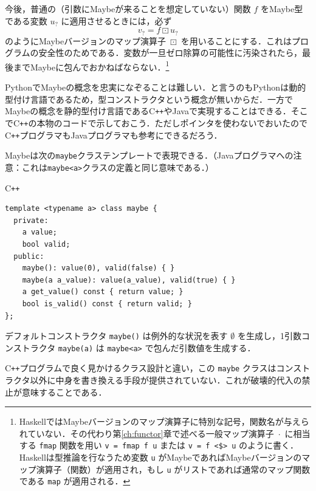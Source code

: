 \documentclass[a5paper,twoside,fleqn,draft]{jsbook}
\newcommand{\programminglanguage}[1]{\textsf{#1}}
\newcommand{\cxx}{\programminglanguage{C}\texttt{++}}
\newcommand{\haskell}{\programminglanguage{Haskell}}
\newcommand{\java}{\programminglanguage{Java}}
\newcommand{\python}{\programminglanguage{Python}}
\newcommand{\code}[1]{\texttt{#1}}
\newenvironment{cxxcode}{\begin{itembox}[r]{\cxx}}{\end{itembox}}
\newcommand{\mNothing}{\emptyset}
\DeclareMathOperator{\mMap}{\cdot}
\DeclareMathOperator{\mMapMaybe}{\boxdot}
\newcommand{\mMaybe}[1]{{#1}_?}
\begin{document}
今後，普通の（引数にMaybeが来ることを想定していない）関数 $f$ をMaybe型である変数 $\mMaybe{u}$ に適用させるときには，必ず
\begin{equation}
  \mMaybe{v}
  =f\mMapMaybe\mMaybe{u}
\end{equation}
のようにMaybeバージョンのマップ演算子 $\mMapMaybe$ を用いることにする．これはプログラムの安全性のためである．変数が一旦ゼロ除算の可能性に汚染されたら，最後までMaybeに包んでおかねばならない．\footnote{\haskell ではMaybeバージョンのマップ演算子に特別な記号，関数名が与えられていない．その代わり第\ref{ch:functor}章で述べる一般マップ演算子 $\mMap$ に相当する \code{fmap} 関数を用い \code{v = fmap f u} または \code{v = f <\$> u} のように書く．\haskell は型推論を行なうため変数 \code{u} がMaybeであればMaybeバージョンのマップ演算子（関数）が適用され，もし \code{u} がリストであれば通常のマップ関数である \code{map} が適用される．}

\python でMaybeの概念を忠実になぞることは難しい．と言うのも\python は動的型付け言語であるため，型コンストラクタという概念が無いからだ．一方でMaybeの概念を静的型付け言語である\cxx や\java で実現することはできる．そこで\cxx の本物のコードで示しておこう．ただしポインタを使わないでおいたので\cxx プログラマも\java プログラマも参考にできるだろう．

Maybeは次の\code{maybe}クラステンプレートで表現できる．（\java プログラマへの注意：これは\code{maybe<a>}クラスの定義と同じ意味である．）
\begin{cxxcode}
\begin{verbatim}
template <typename a> class maybe {
  private:
    a value;
    bool valid;
  public:
    maybe(): value(0), valid(false) { }
    maybe(a a_value): value(a_value), valid(true) { }
    a get_value() const { return value; }
    bool is_valid() const { return valid; }
};
\end{verbatim}
\end{cxxcode}
デフォルトコンストラクタ \code{maybe()} は例外的な状況を表す $\mNothing$ を生成し，1引数コンストラクタ \code{maybe(a)} は \code{maybe<a>} で包んだ引数値を生成する．

\cxx プログラムで良く見かけるクラス設計と違い，この \code{maybe} クラスはコンストラクタ以外に中身を書き換える手段が提供されていない．これが破壊的代入の禁止が意味することである．
\end{document}
